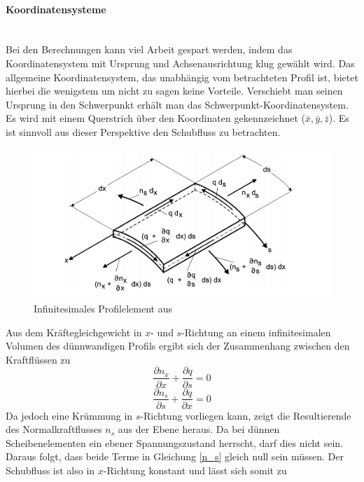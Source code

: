 \paragraph{Koordinatensysteme}~\\
Bei den Berechnungen kann viel Arbeit gespart werden, indem das Koordinatensystem mit Ursprung und Achsenausrichtung klug gewählt wird. Das allgemeine Koordinatensystem, das unabhängig vom betrachteten Profil ist, bietet hierbei die wenigstem um nicht zu sagen keine Vorteile. Verschiebt man seinen Ursprung in den Schwerpunkt erhält man das Schwerpunkt-Koordinatensystem. Es wird mit einem Querstrich über den Koordinaten gekennzeichnet ($\bar{x},\bar{y},\bar{z}$). Es ist sinnvoll aus dieser Perspektive den Schubfluss zu betrachten.
\begin{figure}[h]
	\centering
	\includegraphics[width=1\textwidth]{Bilder/schubfluss-infinit}
	\caption{Infinitesimales Profilelement aus \cite{item15}}
	\label{schubfluss-infinit}
\end{figure}
Aus dem Kräftegleichgewicht in $x$- und $s$-Richtung an einem infinitesimalen Volumen des dünnwandigen Profils ergibt sich der Zusammenhang zwischen den Kraftflüssen zu
\begin{equation}
	\frac{\partial n_x}{\partial x} + \frac{\partial q}{\partial s} = 0
\end{equation}
\begin{equation}\label{n_s}
\frac{\partial n_s}{\partial s} + \frac{\partial q}{\partial x} = 0
\end{equation}
Da jedoch eine Krümmung in $s$-Richtung vorliegen kann, zeigt die Resultierende des Normalkraftflusses $n_s$ aus der Ebene heraus. Da bei dünnen Scheibenelementen ein ebener Spannungszustand herrscht, darf dies nicht sein. Daraus folgt, dass beide Terme in Gleichung \ref{n_s} gleich null sein müssen. Der Schubfluss ist also in $x$-Richtung konstant und lässt sich somit zu

